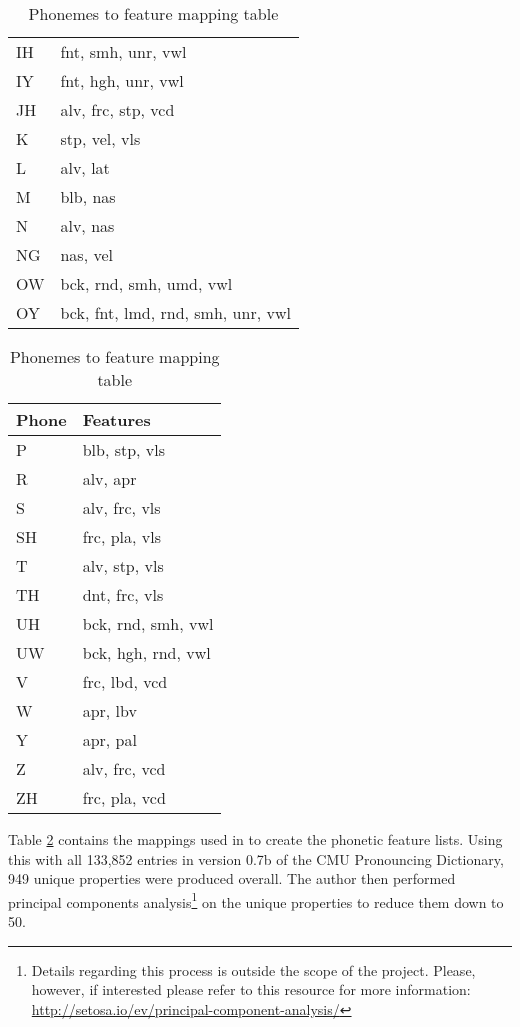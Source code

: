 \begin{table}[!htb]
\begin{minipage}{.33\linewidth}
\begin{tabular}{ll}
            IH & fnt, smh, unr, vwl \\
            IY & fnt, hgh, unr, vwl \\
            JH & alv, frc, stp, vcd \\
            K &  stp, vel, vls \\
            L &  alv, lat \\
            M &  blb, nas \\
            N &  alv, nas \\
            NG & nas, vel \\
            OW & bck, rnd, smh, umd, vwl \\
            OY & bck, fnt, lmd, rnd, smh, unr, vwl
        \end{tabular}
    \end{minipage} 
    \begin{minipage}{.33\linewidth}
        \centering
        \begin{tabular}{ll}
            Phone & Features \\
            \hline
            P & blb, stp, vls \\
            R & alv, apr \\
            S & alv, frc, vls \\
            SH & frc, pla, vls \\
            T & alv, stp, vls \\
            TH & dnt, frc, vls \\
            UH & bck, rnd, smh, vwl \\
            UW & bck, hgh, rnd, vwl \\
            V & frc, lbd, vcd \\
            W & apr, lbv \\
            Y & apr, pal \\
            Z & alv, frc, vcd \\
            ZH & frc, pla, vcd \\
        \end{tabular}
    \end{minipage} 
    \caption{Phonemes to feature mapping table}
    \label{tab:features}
\end{table}

Table \ref{tab:features} contains the mappings used in \cite{parrish2017poetic} to create the phonetic feature lists.
Using this with all 133,852 entries in version 0.7b of the CMU Pronouncing Dictionary, 949 unique properties were produced overall. The author then performed principal components analysis\footnote{Details regarding this process is outside the scope of the project. Please, however, if interested please refer to this resource for more information: \url{http://setosa.io/ev/principal-component-analysis/}} on the unique properties to reduce them down to 50.

